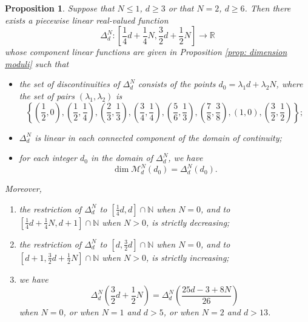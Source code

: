 \documentclass[a4paper,11pt]{amsart}
\newcommand{\M}{\ensuremath{\mathcal{M}}}
\newcommand{\NN}{\ensuremath{\mathbb{N}}}
\newcommand{\RR}{\ensuremath{\mathbb{R}}}
\newtheorem{prop}[thm]{Proposition}
\theoremstyle{definition}
\theoremstyle{remark}
\numberwithin{equation}{section}
\begin{document}
\begin{prop} \label{prop: delta function}
	Suppose that $N \le 1$, $d \ge 3$ or that $N = 2$, $d \ge 6$. Then there exists a piecewise linear real-valued function 
	\[
	\Delta^N_d\colon \left[ \frac14d + \frac14N, \frac32d + \frac12N \right]  \rightarrow \RR
	\]
	whose component linear functions are given in Proposition \ref{prop: dimension moduli} such that
	\begin{itemize}
		\item [(i)] the set of discontinuities of $\Delta^N_d$ consists of the points $d_0 = \lambda_1 d + \lambda_2 N$, where the set of pairs $(\lambda_1, \lambda_2)$ is
		$$
		\left\{ \left(\frac12, 0\right), \left(\frac12, \frac14\right), \left(\frac23, \frac13\right), \left(\frac34, \frac14\right), \left(\frac56, \frac13\right), \left(\frac78, \frac38\right), \left(1, 0\right), \left(\frac32, \frac12\right) \right\};
		$$
		
		\item [(ii)] $\Delta^N_d$ is linear in each connected component of the domain of continuity;
		
		\item [(iii)] for each integer $d_0$ in the domain of $\Delta^N_d$, we have
		$$
		\dim \M^N_d(d_0) = \Delta^N_d(d_0).
		$$
	\end{itemize}
	Moreover,
	\begin{enumerate}
		\item the restriction of $\Delta^N_d$ to ${\left[\frac14d, d\right]} \cap \NN$ when $N = 0$, and to ${\left[\frac14d + \frac14 N, d + 1\right]} \cap \NN$ when $N > 0$, is strictly decreasing;
		
		\item the restriction of $\Delta^N_d$ to ${\left[d, \frac32d\right]} \cap \NN$ when $N = 0$, and to ${\left[d + 1, \frac32d + \frac12N\right]} \cap \NN$ when $N > 0$, is strictly increasing;
		\item we have 
		$$
		\Delta^N_d\left(\frac32d + \frac12 N\right) = \Delta^N_d \left( \frac{25d - 3 + 8N}{26} \right)
		$$
		when $N = 0$, or when $N = 1$ and $d > 5$, or when $N = 2$ and $d > 13$. 
	\end{enumerate}
\end{prop}
\end{document}
